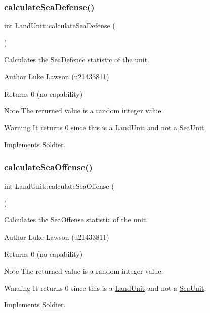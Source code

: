 \subsubsection{\texorpdfstring{calculateSeaDefense()}{calculateSeaDefense()}}
{\footnotesize\ttfamily int Land\+Unit\+::calculate\+Sea\+Defense (\begin{DoxyParamCaption}{ }\end{DoxyParamCaption})\hspace{0.3cm}{\ttfamily [virtual]}}



Calculates the Sea\+Defence statistic of the unit. 

\begin{DoxyAuthor}{Author}
Luke Lawson (u21433811) 
\end{DoxyAuthor}
\begin{DoxyReturn}{Returns}
0 (no capability) 
\end{DoxyReturn}
\begin{DoxyNote}{Note}
The returned value is a random integer value. 
\end{DoxyNote}
\begin{DoxyWarning}{Warning}
It returns 0 since this is a \mbox{\hyperlink{class_land_unit}{Land\+Unit}} and not a \mbox{\hyperlink{class_sea_unit}{Sea\+Unit}}. 
\end{DoxyWarning}


Implements \mbox{\hyperlink{class_soldier_a6508d8539b427a9af01aabc07ba6ca8e}{Soldier}}.

\mbox{\label{class_land_unit_a40d93a3df8b92babc7a4f35a28dd3b73}} 
\subsubsection{\texorpdfstring{calculateSeaOffense()}{calculateSeaOffense()}}
{\footnotesize\ttfamily int Land\+Unit\+::calculate\+Sea\+Offense (\begin{DoxyParamCaption}{ }\end{DoxyParamCaption})\hspace{0.3cm}{\ttfamily [virtual]}}



Calculates the Sea\+Offense statistic of the unit. 

\begin{DoxyAuthor}{Author}
Luke Lawson (u21433811) 
\end{DoxyAuthor}
\begin{DoxyReturn}{Returns}
0 (no capability) 
\end{DoxyReturn}
\begin{DoxyNote}{Note}
The returned value is a random integer value. 
\end{DoxyNote}
\begin{DoxyWarning}{Warning}
It returns 0 since this is a \mbox{\hyperlink{class_land_unit}{Land\+Unit}} and not a \mbox{\hyperlink{class_sea_unit}{Sea\+Unit}}. 
\end{DoxyWarning}


Implements \mbox{\hyperlink{class_soldier_acdaf5453ea0f87b3219185b0a52dd869}{Soldier}}.

